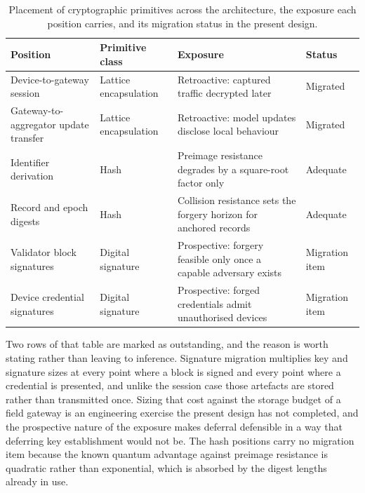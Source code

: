 \begin{table}[!htbp]
  \centering
  \footnotesize
  \setlength{\tabcolsep}{5pt}
  \renewcommand{\arraystretch}{1.3}
  \caption{Placement of cryptographic primitives across the architecture, the exposure each position carries, and its migration status in the present design.}
  \label{tab:pq-placement}
  \begin{tabularx}{\textwidth}{@{}
      >{\raggedright\arraybackslash}p{3.4cm}
      >{\raggedright\arraybackslash}p{2.9cm}
      >{\raggedright\arraybackslash}X
      >{\raggedright\arraybackslash}p{2.3cm}@{}}
    \toprule
    \textbf{Position} & \textbf{Primitive class} & \textbf{Exposure} & \textbf{Status} \\
    \midrule
    Device-to-gateway session
      & Lattice encapsulation
      & Retroactive: captured traffic decrypted later
      & Migrated \\
    Gateway-to-aggregator update transfer
      & Lattice encapsulation
      & Retroactive: model updates disclose local behaviour
      & Migrated \\
    Identifier derivation
      & Hash
      & Preimage resistance degrades by a square-root factor only
      & Adequate \\
    Record and epoch digests
      & Hash
      & Collision resistance sets the forgery horizon for anchored records
      & Adequate \\
    Validator block signatures
      & Digital signature
      & Prospective: forgery feasible only once a capable adversary exists
      & Migration item \\
    Device credential signatures
      & Digital signature
      & Prospective: forged credentials admit unauthorised devices
      & Migration item \\
    \bottomrule
  \end{tabularx}
\end{table}

Two rows of that table are marked as outstanding, and the reason is worth stating rather than leaving to inference. Signature migration multiplies key and signature sizes at every point where a block is signed and every point where a credential is presented, and unlike the session case those artefacts are stored rather than transmitted once. Sizing that cost against the storage budget of a field gateway is an engineering exercise the present design has not completed, and the prospective nature of the exposure makes deferral defensible in a way that deferring key establishment would not be. The hash positions carry no migration item because the known quantum advantage against preimage resistance is quadratic rather than exponential, which is absorbed by the digest lengths already in use.

